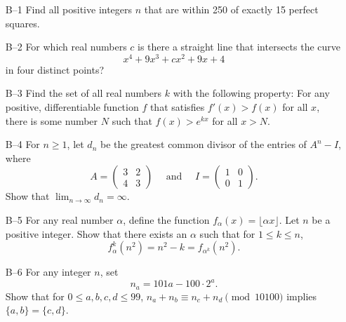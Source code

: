 \documentclass[amssymb,twocolumn,pra,10pt,aps]{revtex4-1}
\begin{document}
\begin{itemize}
\item[B--1]
Find all positive integers $n$ that are within 250 of exactly 15 perfect
squares.

\item[B--2]
For which real numbers $c$ is there a straight line that intersects the curve
\[ x^4 + 9x^3 + cx^2 + 9x + 4
\]
in four distinct points?

\item[B--3]
Find the set of all real numbers $k$ with the following property: For any
positive, differentiable function $f$ that satisfies $f'(x) > f(x)$
for all $x$, there is some number $N$ such that
$f(x) > e^{kx}$ for all $x > N$.

\item[B--4]
For $n \geq 1$, let $d_n$ be the greatest common divisor of the entries of
$A^n - I$, where
\[
A = \begin{pmatrix} 3 & 2 \\ 4 & 3 \end{pmatrix}
\quad \mbox{ and } \quad
I = \begin{pmatrix} 1 & 0 \\ 0 & 1 \end{pmatrix}.
\]
Show that $\lim_{n \to \infty} d_n = \infty$.

\item[B--5]
For any real number $\alpha$, define the function $f_{\alpha}(x)
= \lfloor \alpha x \rfloor$. Let $n$ be a positive integer. Show that
there exists an $\alpha$ such that for $1 \leq k \leq n$,
\[
f_\alpha^k(n^2) = n^2 - k = f_{\alpha^k}(n^2).
\]

\item[B--6]
For any integer $n$, set
\[
n_a = 101a - 100\cdot 2^a.
\]
Show that for $0 \leq a,b,c,d \leq 99$, $n_a + n_b \equiv
n_c + n_d \pmod{10100}$ implies $\{a,b\} = \{c,d\}$.

\end{itemize}
\end{document}
